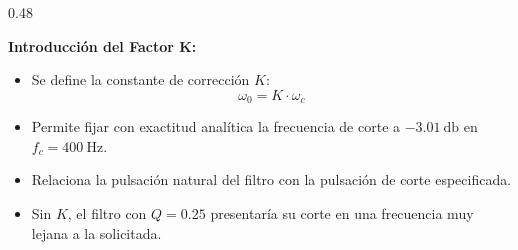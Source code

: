 \begin{frame}
\begin{columns}[t, onlytextwidth]
    \begin{column}{0.48\textwidth}
      \begin{tarjeta}[colframe=BlueAccent]
        {\fontsize{9pt}{11pt}\selectfont \textbf{\color{BlueAccent} Introducción del Factor K:}}\\[2pt]
        {\fontsize{8pt}{10pt}\selectfont
        \begin{itemize}\setlength{\itemsep}{1.5pt}
          \item Se define la constante de corrección $K$:
          \[ \omega_0 = K \cdot \omega_c \]
          \item Permite fijar con exactitud analítica la frecuencia de corte a $\qty{-3.01}{\decibel}$ en $f_c = \qty{400}{\hertz}$.
          \item Relaciona la pulsación natural del filtro con la pulsación de corte especificada.
          \item Sin $K$, el filtro con $Q=0.25$ presentaría su corte en una frecuencia muy lejana a la solicitada.
        \end{itemize}
        }
      \end{tarjeta}
    \end{column}
  \end{columns}
\end{frame}

